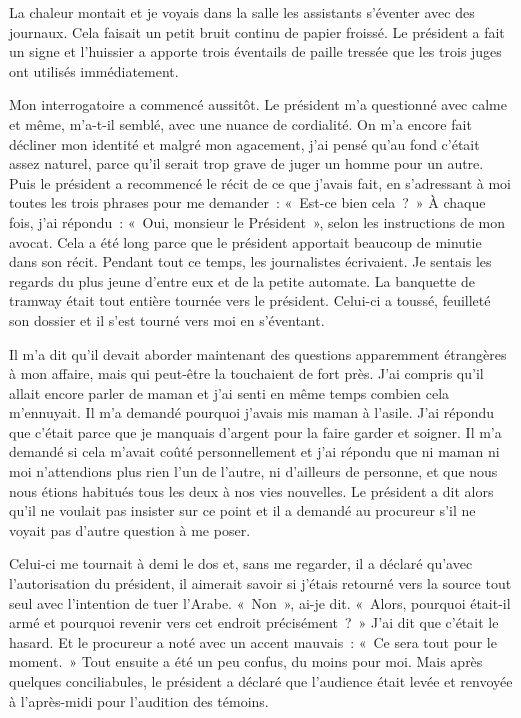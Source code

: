 \documentclass[french,twoside]{book} %
\begin{document}
La chaleur montait et je voyais dans la salle les assistants s’éventer avec des journaux. Cela faisait un petit bruit continu de papier froissé. Le président a fait un signe et l’huissier a apporte trois éventails de paille tressée que les trois juges ont utilisés immédiatement.\par
Mon interrogatoire a commencé aussitôt. Le président m’a questionné avec calme et même, m’a-t-il semblé, avec une nuance de cordialité. On m’a encore fait décliner mon identité et malgré mon agacement, j’ai pensé qu’au fond c’était assez naturel, parce qu’il serait trop grave de juger un homme pour un autre. Puis le président a recommencé le récit de ce que j’avais fait, en s’adressant à moi toutes les trois phrases pour me demander : « Est-ce bien cela ? » À chaque fois, j’ai répondu : « Oui, monsieur le Président », selon les instructions de mon avocat. Cela a été long parce que le président apportait beaucoup de minutie dans son récit. Pendant tout ce temps, les journalistes écrivaient. Je sentais les regards du plus jeune d’entre eux et de la petite automate. La banquette de tramway était tout entière tournée vers le président. Celui-ci a toussé, feuilleté son dossier et il s’est tourné vers moi en s’éventant.\par
Il m’a dit qu’il devait aborder maintenant des questions apparemment étrangères à mon affaire, mais qui peut-être la touchaient de fort près. J'ai compris qu’il allait encore parler de maman et j’ai senti en même temps combien cela m’ennuyait. Il m’a demandé pourquoi j’avais mis maman à l’asile. J'ai répondu que c’était parce que je manquais d’argent pour la faire garder et soigner. Il m’a demandé si cela m’avait coûté personnellement et j’ai répondu que ni maman ni moi n’attendions plus rien l’un de l’autre, ni d’ailleurs de personne, et que nous nous étions habitués tous les deux à nos vies nouvelles. Le président a dit alors qu’il ne voulait pas insister sur ce point et il a demandé au procureur s’il ne voyait pas d’autre question à me poser.\par
Celui-ci me tournait à demi le dos et, sans me regarder, il a déclaré qu’avec l’autorisation du président, il aimerait savoir si j’étais retourné vers la source tout seul avec l’intention de tuer l’Arabe. « Non », ai-je dit. « Alors, pourquoi était-il armé et pourquoi revenir vers cet endroit précisément ? » J'ai dit que c’était le hasard. Et le procureur a noté avec un accent mauvais : « Ce sera tout pour le moment. » Tout ensuite a été un peu confus, du moins pour moi. Mais après quelques conciliabules, le président a déclaré que l’audience était levée et renvoyée à l’après-midi pour l’audition des témoins.\par
\end{document}
